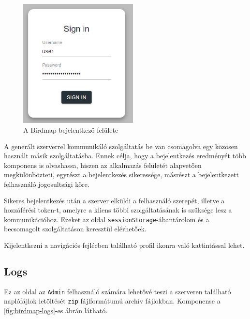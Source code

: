 \begin{figure}[!ht]
    \centering
    \includegraphics[width=60mm, keepaspectratio]{figures/birdmap-login.png}
    \caption{A Birdmap bejelentkező felülete}
    \label{fig:birdmap-login}
\end{figure}

A generált szerverrel kommunikáló szolgáltatás be van csomagolva egy közösen használt másik szolgáltatásba.
Ennek célja, hogy a bejelentkezés eredményét több komponens is olvashassa, hiszen az alkalmazás felületét alapvetően megkülönbözteti,
egyrészt a bejelentkezés sikeressége, másrészt a bejelentkezett felhasználó jogosultsági köre.

Sikeres bejelentkezés után a szerver elküldi a felhasználó szerepét, illetve a hozzáférési token-t, amelyre a kliens többi szolgáltatásának is szüksége lesz a kommunikációhoz. 
Ezeket az oldal \verb+sessionStorage+-ában\footnotemark tárolom és a becsomagolt szolgáltatáson keresztül elérhetőek.

Kijelentkezni a navigációs fejlécben található profil ikonra való kattintással lehet.


\subsection{Logs}
Ez az oldal az \verb+Admin+ felhasználó számára lehetővé teszi a szerveren található naplófájlok letöltését \verb+zip+ fájlformátumú archív fájlokban.
Komponense a \ref{fig:birdmap-logs}-es ábrán látható.

